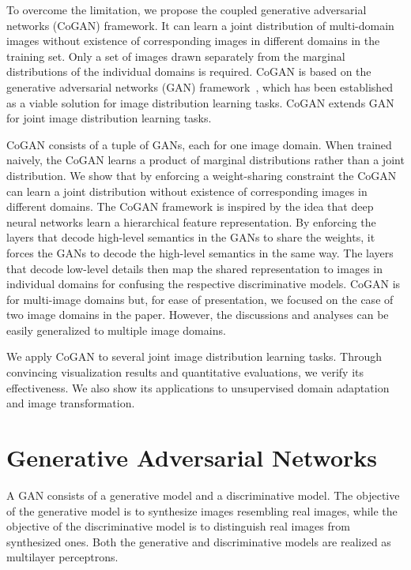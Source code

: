\documentclass{article}
\begin{document}
To overcome the limitation, we propose the coupled generative adversarial networks (CoGAN) framework. It can learn a joint distribution of multi-domain images without existence of corresponding images in different domains in the training set. Only a set of images drawn separately from the marginal distributions of the individual domains is required. CoGAN is based on the generative adversarial networks (GAN) framework~\cite{goodfellow2014generative}, which has been established as a viable solution for image distribution learning tasks. CoGAN extends GAN for joint image distribution learning tasks.

CoGAN consists of a tuple of GANs, each for one image domain. When trained naively, the CoGAN learns a product of marginal distributions rather than a joint distribution. We show that by enforcing a weight-sharing constraint the CoGAN can learn a joint distribution without existence of corresponding images in different domains. The CoGAN framework is inspired by the idea that deep neural networks learn a hierarchical feature representation. By enforcing the layers that decode high-level semantics in the GANs to share the weights, it forces the GANs to decode the high-level semantics in the same way. The layers that decode low-level details then map the shared representation to images in individual domains for confusing the respective discriminative models. CoGAN is for multi-image domains but, for ease of presentation, we focused on the case of two image domains in the paper. However, the discussions and analyses can be easily generalized to multiple image domains.

We apply CoGAN to several joint image distribution learning tasks. Through convincing visualization results and quantitative evaluations, we verify its effectiveness. We also show its applications to unsupervised domain adaptation and image transformation. \section{Generative Adversarial Networks}\label{sec::gan}

A GAN consists of a generative model and a discriminative model. The objective of the generative model is to synthesize images resembling real images, while the objective of the discriminative model is to distinguish real images from synthesized ones. Both the generative and discriminative models are realized as multilayer perceptrons. 
\end{document}
